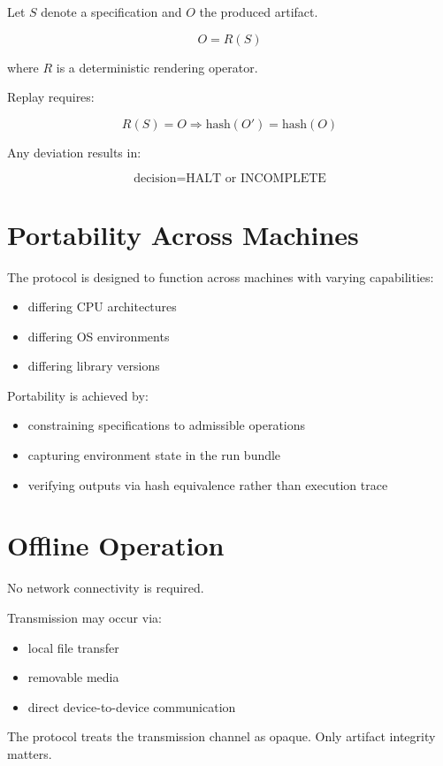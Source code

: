 \documentclass[11pt]{article}
\begin{document}
Let $S$ denote a specification and $O$ the produced artifact.

\[
O = R(S)
\]

where $R$ is a deterministic rendering operator.

Replay requires:

\[
R(S) = O \Rightarrow \text{hash}(O') = \text{hash}(O)
\]

Any deviation results in:

\[
\text{decision} = \text{HALT or INCOMPLETE}
\]

\section{Portability Across Machines}

The protocol is designed to function across machines with varying capabilities:

\begin{itemize}
\item differing CPU architectures
\item differing OS environments
\item differing library versions
\end{itemize}

Portability is achieved by:

\begin{itemize}
\item constraining specifications to admissible operations
\item capturing environment state in the run bundle
\item verifying outputs via hash equivalence rather than execution trace
\end{itemize}

\section{Offline Operation}

No network connectivity is required.

Transmission may occur via:

\begin{itemize}
\item local file transfer
\item removable media
\item direct device-to-device communication
\end{itemize}

The protocol treats the transmission channel as opaque. Only artifact integrity matters.
\end{document}
